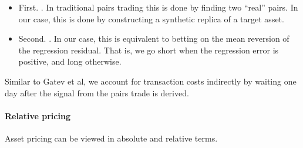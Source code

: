 \begin{itemize}
\item First. . In traditional pairs trading this is done by finding two ``real'' pairs. In our case, this is done by constructing a synthetic replica of a target asset.
\item Second. . In our case, this is equivalent to betting on the mean reversion of the regression residual. That is, we go short when the regression error is positive, and long otherwise.
\end{itemize}



Similar to Gatev et al, we account for transaction costs indirectly by waiting one day after the signal from the pairs trade is derived. 	


\paragraph{Relative pricing}
Asset pricing can be viewed in absolute and relative terms. 

